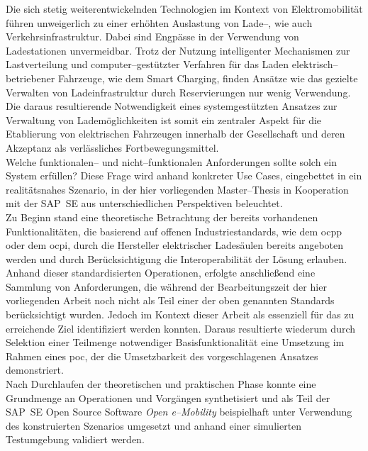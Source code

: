 
\Abstract
Die sich stetig weiterentwickelnden Technologien im Kontext von Elektromobilit\"at  f\"uhren unweigerlich zu einer erh\"ohten Auslastung von Lade--, wie auch Verkehrsinfrastruktur. Dabei sind Engp\"asse in der Verwendung von Ladestationen unvermeidbar. 
Trotz der Nutzung intelligenter Mechanismen zur Lastverteilung und computer--gest\"utzter Verfahren f\"ur das Laden elektrisch--betriebener Fahrzeuge, wie dem Smart Charging, finden Ans\"atze wie das gezielte Verwalten von Ladeinfrastruktur durch Reservierungen nur wenig Verwendung.
Die daraus resultierende Notwendigkeit eines systemgest\"utzten Ansatzes zur Verwaltung von Ladem\"oglichkeiten ist somit ein zentraler Aspekt f\"ur die Etablierung von elektrischen Fahrzeugen innerhalb der Gesellschaft und deren Akzeptanz als verl\"assliches Fortbewegungsmittel.\\
Welche funktionalen-- und nicht--funktionalen Anforderungen sollte solch ein System erf\"ullen? Diese Frage wird anhand konkreter Use Cases, eingebettet in ein realitätsnahes Szenario, in der hier vorliegenden Master--Thesis in Kooperation mit der SAP~SE aus unterschiedlichen Perspektiven beleuchtet.\\
Zu Beginn stand eine theoretische Betrachtung der bereits vorhandenen Funktionalit\"aten, die basierend auf offenen Industriestandards, wie dem \acrfull{ocpp} oder dem \acrfull{ocpi}, durch die Hersteller elektrischer Lades\"aulen bereits angeboten werden und durch Ber\"ucksichtigung die Interoperabilit\"at der L\"osung erlauben.
Anhand dieser standardisierten Operationen, erfolgte anschließend eine Sammlung von Anforderungen, die w\"ahrend der Bearbeitungszeit der hier vorliegenden Arbeit noch nicht als Teil einer der oben genannten Standards ber\"ucksichtigt wurden. Jedoch im Kontext dieser Arbeit als essenziell f\"ur das zu erreichende Ziel identifiziert werden konnten.
Daraus resultierte wiederum durch Selektion einer Teilmenge notwendiger Basisfunktionalit\"at eine Umsetzung im Rahmen eines \acrfull{poc}, der die Umsetzbarkeit des vorgeschlagenen Ansatzes demonstriert.\\
Nach Durchlaufen der theoretischen und praktischen Phase konnte eine Grundmenge an Operationen und Vorg\"angen synthetisiert und als Teil der SAP~SE Open Source Software \textit{Open e--Mobility} beispielhaft unter Verwendung des konstruierten Szenarios umgesetzt und anhand einer simulierten Testumgebung validiert werden.
